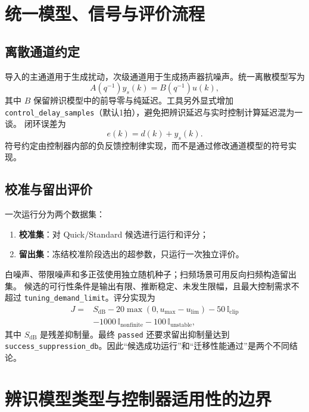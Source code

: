 \documentclass[UTF8,11pt,a4paper]{ctexart}
\begin{document}
\section{统一模型、信号与评价流程}

\subsection{离散通道约定}

导入的主通道用于生成扰动，次级通道用于生成扬声器抗噪声。统一离散模型写为
\begin{equation}
  A(q^{-1})y_s(k)=B(q^{-1})u(k),
\end{equation}
其中 $B$ 保留辨识模型中的前导零与纯延迟。工具另外显式增加
\texttt{control\_delay\_samples}（默认1拍），避免把辨识延迟与实时控制计算延迟混为一谈。
闭环误差为
\begin{equation}
  e(k)=d(k)+y_s(k).
\end{equation}
符号约定由控制器内部的负反馈控制律实现，而不是通过修改通道模型的符号实现。

\subsection{校准与留出评价}

一次运行分为两个数据集：
\begin{enumerate}
  \item \textbf{校准集}：对 Quick/Standard 候选进行运行和评分；
  \item \textbf{留出集}：冻结校准阶段选出的超参数，只运行一次独立评价。
\end{enumerate}
白噪声、带限噪声和多正弦使用独立随机种子；扫频场景可用反向扫频构造留出集。
候选的可行性条件是输出有限、推断稳定、未发生限幅，且最大控制需求不超过
\texttt{tuning\_demand\_limit}。评分实现为
\begin{align}
J={}&S_{\mathrm{dB}}
-20\max(0,u_{\max}-u_{\mathrm{lim}})
-50\,\mathbb{I}_{\mathrm{clip}} \\
&-1000\,\mathbb{I}_{\mathrm{nonfinite}}
-100\,\mathbb{I}_{\mathrm{unstable}},
\end{align}
其中 $S_{\mathrm{dB}}$ 是残差抑制量。最终 \texttt{passed} 还要求留出抑制量达到
\texttt{success\_suppression\_db}。因此“候选成功运行”和“迁移性能通过”是两个不同结论。

\section{辨识模型类型与控制器适用性的边界}
\end{document}
